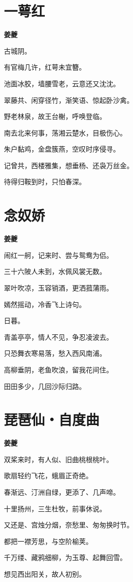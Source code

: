 \documentclass[12pt,a4paper]{ctexbook}
\begin{document}
\section{一萼红}
\textbf{姜夔}\par\vspace{0.5em}
古城阴。\par
有官梅几许，红萼未宜簪。\par
池面冰胶，墙腰雪老，云意还又沈沈。\par
翠藤共、闲穿径竹，渐笑语、惊起卧沙禽。\par
野老林泉，故王台榭，呼唤登临。\par
南去北来何事，荡湘云楚水，目极伤心。\par
朱户黏鸡，金盘簇燕，空叹时序侵寻。\par
记曾共，西楼雅集，想垂杨、还袅万丝金。\par
待得归鞍到时，只怕春深。\par

\section{念奴娇}
\textbf{姜夔}\par\vspace{0.5em}
闹红一舸，记来时、尝与鸳鸯为侣。\par
三十六陂人未到，水佩风裳无数。\par
翠叶吹凉，玉容销酒，更洒菰蒲雨。\par
嫣然摇动，冷香飞上诗句。\par
日暮。\par
青盖亭亭，情人不见，争忍凌波去。\par
只恐舞衣寒易落，愁入西风南浦。\par
高柳垂阴，老鱼吹浪，留我花间住。\par
田田多少，几回沙际归路。\par

\section{琵琶仙・自度曲}
\textbf{姜夔}\par\vspace{0.5em}
双桨来时，有人似、旧曲桃根桃叶。\par
歌扇轻约飞花，蛾眉正奇绝。\par
春渐远、汀洲自绿，更添了、几声啼。\par
十里扬州，三生杜牧，前事休说。\par
又还是、宫烛分烟，奈愁里、匆匆换时节。\par
都把一襟芳思，与空阶榆荚。\par
千万缕、藏鸦细柳，为玉尊、起舞回雪。\par
想见西出阳关，故人初别。\par
\end{document}
